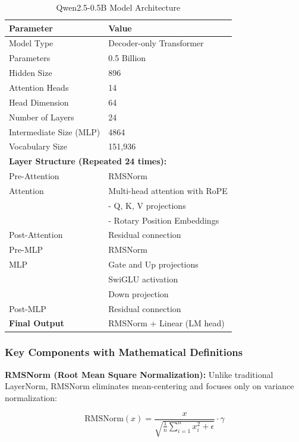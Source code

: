 \documentclass{article}
\begin{document}
\begin{table}[ht]
\centering
\begin{tabular}{ll}
\hline
\textbf{Parameter} & \textbf{Value} \\
\hline
Model Type & Decoder-only Transformer \\
Parameters & 0.5 Billion \\
Hidden Size & 896 \\
Attention Heads & 14 \\
Head Dimension & 64 \\
Number of Layers & 24 \\
Intermediate Size (MLP) & 4864 \\
Vocabulary Size & 151,936 \\
\hline
\multicolumn{2}{l}{\textbf{Layer Structure (Repeated 24 times):}} \\
\hline
Pre-Attention & RMSNorm \\
Attention & Multi-head attention with RoPE \\
& \quad - Q, K, V projections \\
& \quad - Rotary Position Embeddings \\
Post-Attention & Residual connection \\
Pre-MLP & RMSNorm \\
MLP & Gate and Up projections \\
& SwiGLU activation \\
& Down projection \\
Post-MLP & Residual connection \\
\hline
\textbf{Final Output} & RMSNorm + Linear (LM head) \\
\hline
\end{tabular}
\caption{Qwen2.5-0.5B Model Architecture}
\label{tab:qwen25-overview} 
\end{table}

\subsubsection*{Key Components with Mathematical Definitions}

\textbf{RMSNorm (Root Mean Square Normalization):} Unlike traditional LayerNorm, RMSNorm eliminates mean-centering and focuses only on variance normalization:

\begin{equation}
\text{RMSNorm}(x) = \frac{x}{\sqrt{\frac{1}{n}\sum_{i=1}^{n}x_i^2 + \epsilon}} \cdot \gamma
\end{equation}
\end{document}

